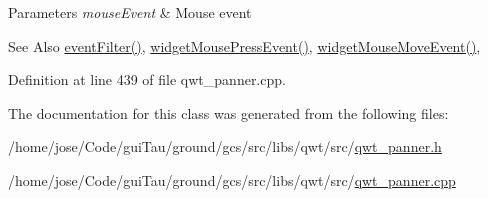 \begin{DoxyParams}{Parameters}
{\em mouse\-Event} & Mouse event \\
\hline
\end{DoxyParams}
\begin{DoxySeeAlso}{See Also}
\hyperlink{class_qwt_panner_a06b8eea86d4dcbe361c4af41a263f2cb}{event\-Filter()}, \hyperlink{class_qwt_panner_ae002958978dcc751f9edda24e5858dd9}{widget\-Mouse\-Press\-Event()}, \hyperlink{class_qwt_panner_a6545bc6e25018253c59fc27a48eb948f}{widget\-Mouse\-Move\-Event()}, 
\end{DoxySeeAlso}


Definition at line 439 of file qwt\-\_\-panner.\-cpp.



The documentation for this class was generated from the following files\-:\begin{DoxyCompactItemize}
\item 
/home/jose/\-Code/gui\-Tau/ground/gcs/src/libs/qwt/src/\hyperlink{qwt__panner_8h}{qwt\-\_\-panner.\-h}\item 
/home/jose/\-Code/gui\-Tau/ground/gcs/src/libs/qwt/src/\hyperlink{qwt__panner_8cpp}{qwt\-\_\-panner.\-cpp}\end{DoxyCompactItemize}
